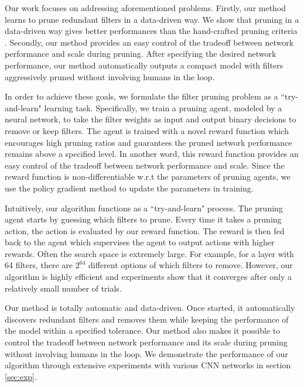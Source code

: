 \documentclass[10pt,twocolumn,letterpaper]{article}
\begin{document}
Our work focuses on addressing aforementioned problems. Firstly, our method learns to prune redundant filters in a data-driven way. We show that pruning in a data-driven way gives better performances than the hand-crafted pruning criteria \cite{iclr17}. Secondly, our method provides an easy control of the tradeoff between network performance and scale during pruning. After specifying the desired network performance, our method automatically outputs a compact model with filters aggressively pruned without involving humans in the loop.

In order to achieve these goals, we formulate the filter pruning problem as a ``try-and-learn" learning task. Specifically, we train a pruning agent, modeled by a neural network, to take the filter weights as input and output binary decisions to remove or keep filters. The agent is trained with a novel reward function which encourages high pruning ratios and guarantees the pruned network performance remains above a specified level. In another word, this reward function provides an easy control of the tradeoff between network performance and scale. Since the reward function is non-differentiable w.r.t the parameters of pruning agents, we use the policy gradient method \cite{pg, reinforce} to update the parameters in training.

Intuitively, our algorithm functions as a ``try-and-learn" process. The pruning agent starts by guessing which filters to prune. Every time it takes a pruning action, the action is evaluated by our reward function. The reward is then fed back to the agent which supervises the agent to output actions with higher rewards. Often the search space is extremely large. For example, for a layer with 64 filters, there are $2^{64}$ different options of which filters to remove. However, our algorithm is highly efficient and experiments show that it converges after only a relatively small number of trials. 

Our method is totally automatic and data-driven. Once started, it automatically discovers redundant filters and removes them while keeping the performance of the model within a specified tolerance. Our method also makes it possible to control the tradeoff between network performance and its scale during pruning without involving humans in the loop. We demonstrate the performance of our algorithm through extensive experiments with various CNN networks in section \ref{sec:exp}.
\end{document}
